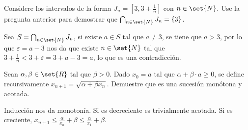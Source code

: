 \documentclass{ayudantia}
\begin{document}
\begin{ans}
    \begin{sol}
        
    \end{sol}
\end{ans}


\begin{prob}
    Considere los intervalos de la forma \(J_n=[3,3+\frac1n]\) con \(n\in\set{N}\). Use la pregunta anterior para demostrar que \(\bigcap_{n\in\set{N}}J_n=\{3\}\).
\end{prob}

\begin{ans}
    \begin{sol}
        Sea \(S=\bigcap_{n\in\set{N}}J_n\), si existe \(a\in S\) tal que \(a\neq 3\), se tiene que \(a>3\), por lo que \(\varepsilon=a-3\) nos da que existe \(n\in\set{N}\) tal que \(3+\frac1n<3+\varepsilon=3+a-3=a\), lo que es una contradicción.
    \end{sol}
\end{ans}


\begin{prob}
    Sean \(\alpha,\beta\in\set{R}\) tal que \(\beta>0\). Dado \(x_0=a\) tal que \(\alpha+\beta\cdot a\geq0\), se define recursivamente \(x_{n+1}=\sqrt{\alpha+\beta x_n}\). Demuestre que es una sucesión monótona y acotada.
\end{prob}

\begin{ans}
    \begin{sol}
        Inducción nos da monotonía. Si es decreciente es trivialmente acotada. Si es creciente, \(x_{n+1}\leq\frac\alpha{x_n}+\beta\leq\frac\alpha{x_1}+\beta\).
    \end{sol}
\end{ans}
\end{document}
